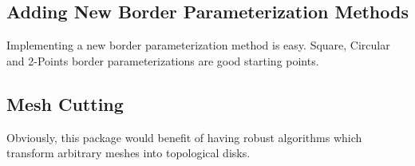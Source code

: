 \subsection{Adding New Border Parameterization Methods}

Implementing a new border parameterization method is easy.
Square, Circular and 2-Points border parameterizations are good starting points.


\subsection{Mesh Cutting}

Obviously, this package would benefit of having robust algorithms
which transform arbitrary meshes into topological disks.

